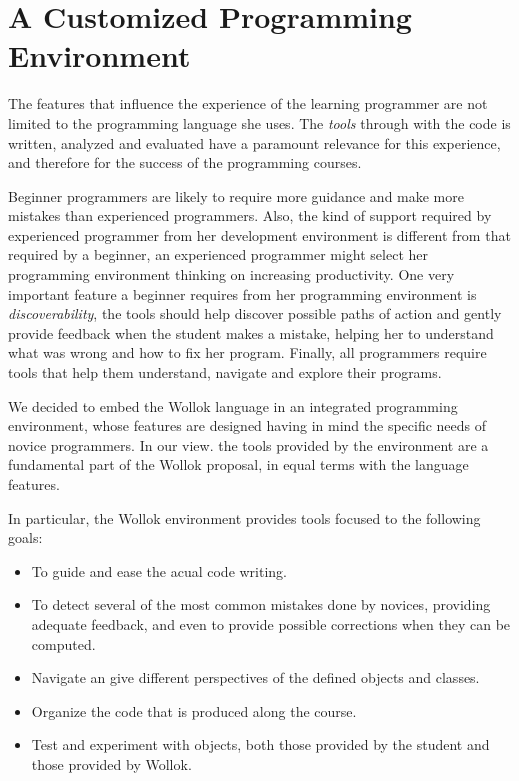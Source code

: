 \section{A Customized Programming Environment}
\label{sec:environment}


The features that influence the experience of the learning programmer are not limited to the programming language she uses. 
The \emph{tools} through with the code is written, analyzed and evaluated have a paramount relevance for this experience, and therefore for the success of the programming courses.

Beginner programmers are likely to require more guidance and make more mistakes than experienced programmers.
Also, the kind of support required by experienced programmer from her development environment is different from that required by a beginner, \eg an experienced programmer might select her programming environment thinking on increasing productivity.
One very important feature a beginner requires from her programming environment is \emph{discoverability}, \ie the tools should help discover possible paths of action and gently provide feedback when the student makes a mistake, helping her to understand what was wrong and how to fix her program.
Finally, all programmers require tools that help them understand, navigate and explore their programs.

\medskip 

We decided to embed the Wollok language in an integrated programming environment, whose features are designed having in mind the specific needs of novice programmers.
In our view. the tools provided by the environment are a fundamental part of the Wollok proposal, in equal terms with the language features.

In particular, the Wollok environment provides tools focused to the following goals:
\begin{itemize}
\item To guide and ease the acual code writing.
\item To detect several of the most common mistakes done by novices, providing adequate feedback, and even to provide possible corrections when they can be computed.
\item Navigate an give different perspectives of the defined objects and classes.
\item Organize the code that is produced along the course.
\item Test and experiment with objects, both those provided by the student and those provided by Wollok.
\end{itemize}


